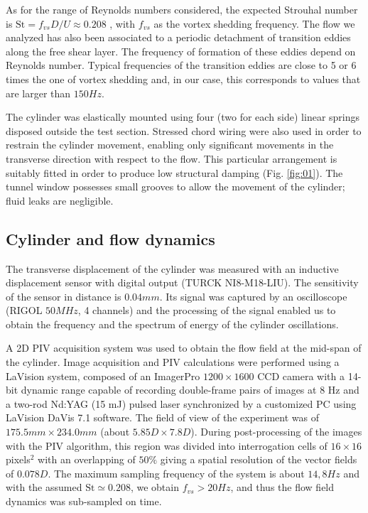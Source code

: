 \documentclass[review]{elsarticle}
\begin{document}
As for the range of Reynolds numbers considered, the expected Strouhal number is $\text{St}=f_{vs}D/U \approx 0.208$ \citep{Fey98}, with $f_{vs}$ as the vortex shedding frequency. The flow we analyzed has also been associated to a periodic detachment of transition eddies along the free shear layer. The frequency of formation  of these eddies depend on Reynolds number. Typical frequencies of the transition eddies are close to 5 or 6 times the one of vortex shedding and, in our case, this corresponds to values that are larger than $150 Hz$.

The cylinder was elastically mounted using four (two for each side) linear springs disposed outside the test section. Stressed chord wiring were also used in order to restrain the cylinder movement, enabling only significant movements in the transverse direction with respect to the flow. This particular arrangement is suitably fitted in order to produce low structural damping (Fig. \ref{fig:01}). The tunnel window possesses small grooves to allow the movement of the cylinder; fluid leaks are negligible.

\subsection*{Cylinder and flow dynamics}

The transverse displacement of the cylinder was measured with an inductive displacement sensor with digital output (TURCK  NI8-M18-LIU). The sensitivity of the sensor in distance is $0.04mm$. Its signal was captured by an oscilloscope (RIGOL $50 MHz$, 4 channels) and the processing of the signal enabled us to obtain the frequency and the spectrum of energy of the cylinder oscillations.

A 2D PIV acquisition system was used to obtain the  flow field at the mid-span of the cylinder.  Image acquisition and PIV calculations were performed using a LaVision system, composed of an ImagerPro $1200 \times 1600$ CCD camera with a 14-bit dynamic range capable of recording double-frame pairs of images at 8 Hz and a two-rod Nd:YAG (15 mJ) pulsed laser synchronized by a customized PC using LaVision DaVis 7.1 software. The field of view of the experiment was of $175.5mm  \times  234.0mm$ (about $5.85 D \times  7.8 D$). During post-processing of the images with the PIV algorithm, this region was divided into interrogation cells of $16  \times  16$ pixels$^2$ with an overlapping of $50 \% $ giving a spatial resolution of the vector fields of $0.078D$. The maximum sampling frequency of the system is about $14,8 Hz$ and with the assumed $\text{St}\simeq 0.208$, we obtain $f_{vs} > 20Hz$, and thus the flow field dynamics was sub-sampled on time.
\end{document}
